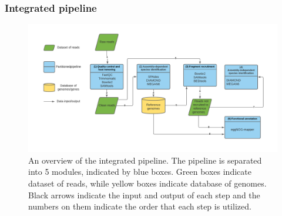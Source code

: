 \documentclass[11pt]{article}
\begin{document}
      \subsubsection{Integrated pipeline}

      \begin{figure}[H]
        \centering
        \includegraphics[width=\textwidth]{../Figures/FigurePipeline.pdf}
        \caption{An overview of the integrated pipeline. 
        The pipeline is separated into 5 modules, indicated by blue boxes. 
        Green boxes indicate dataset of reads, while yellow boxes indicate database of genomes. 
        Black arrows indicate the input and output of each step and the numbers on them indicate the order that each step is utilized.}
        \label{Pipeline}
      \end{figure}
      
\end{document}
